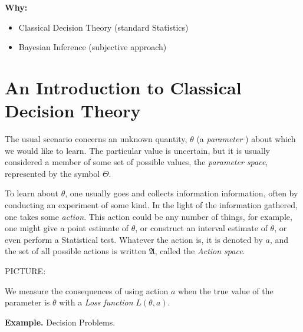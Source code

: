 \documentclass[captions=tableheading]{scrbook}
\begin{document}
\textbf{Why:}

\begin{itemize}
\item Classical Decision Theory (standard Statistics)
\item Bayesian Inference (subjective approach)
\end{itemize}
\section{An Introduction to Classical Decision Theory}
\label{sec-3_1}


The usual scenario concerns an unknown quantity, $\theta$ (a \emph{parameter} ) about which we would like to learn. The particular value is uncertain, but it is usually considered a member of some set of possible values, the \emph{parameter space}, represented by the symbol $\Theta$.

To learn about $\theta$, one usually goes and collects information information, often by conducting an experiment of some kind. In the light of the information gathered, one takes some \emph{action}. This action could be any number of things, for example, one might give a point estimate of $\theta$, or construct an interval estimate of $\theta$, or even perform a Statistical test. Whatever the action is, it is denoted by $a$, and the set of all possible actions is written $\mathfrak{A}$, called the \emph{Action space}.

PICTURE: 

\vspace{1.5in}


We measure the consequences of using action $a$ when the true value of the parameter is $\theta$ with a \emph{Loss function} $L(\theta,a)$.

\textbf{Example.} Decision Problems.
\end{document}
